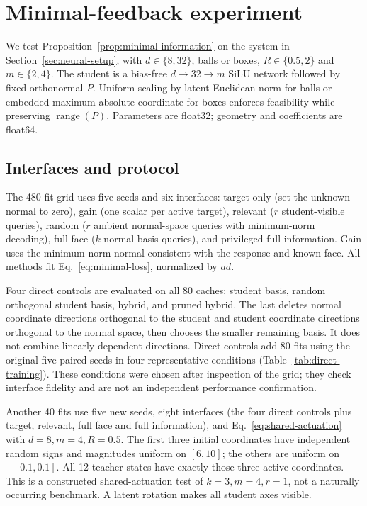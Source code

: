 \section{Minimal-feedback experiment}\label{sec:minimal-experiment}
We test Proposition~\ref{prop:minimal-information} on the system in
Section~\ref{sec:neural-setup}, with $d\in\{8,32\}$, balls or boxes,
$R\in\{0.5,2\}$ and $m\in\{2,4\}$. The student is a bias-free
$d\to32\to m$ SiLU network followed by fixed orthonormal $P$.
Uniform scaling by latent Euclidean norm for balls or embedded maximum
absolute coordinate for boxes enforces feasibility while preserving
$\operatorname{range}(P)$. Parameters are float32; geometry and
coefficients are float64.

\subsection{Interfaces and protocol}
The 480-fit grid uses five seeds and six interfaces: target only
(set the unknown normal to zero), gain (one scalar per active target),
relevant ($r$ student-visible queries), random ($r$ ambient normal-space
queries with minimum-norm decoding), full face ($k$ normal-basis queries),
and privileged full information. Gain uses the minimum-norm normal
consistent with the response and known face. All methods fit
Eq.~\eqref{eq:minimal-loss}, normalized by $ad$.

Four direct controls are evaluated on all 80 caches: student basis,
random orthogonal student basis, hybrid, and pruned hybrid. The last
deletes normal coordinate directions orthogonal to the student and
student coordinate directions orthogonal to the normal space, then
chooses the smaller remaining basis. It does not combine linearly
dependent directions. Direct controls add 80 fits using the original
five paired seeds in four representative conditions
(Table~\ref{tab:direct-training}). These conditions were chosen after
inspection of the grid; they check interface fidelity and are not an
independent performance confirmation.

Another 40 fits use five new seeds, eight interfaces (the four direct
controls plus target, relevant, full face and full information), and
Eq.~\eqref{eq:shared-actuation} with $d=8,m=4,R=0.5$. The first three
initial coordinates have independent random signs and magnitudes
uniform on $[6,10]$; the others are uniform on $[-0.1,0.1]$. All 12
teacher states have exactly those three active coordinates. This is a
constructed shared-actuation test of $k=3,m=4,r=1$, not a naturally
occurring benchmark. A latent rotation makes all student axes visible.

